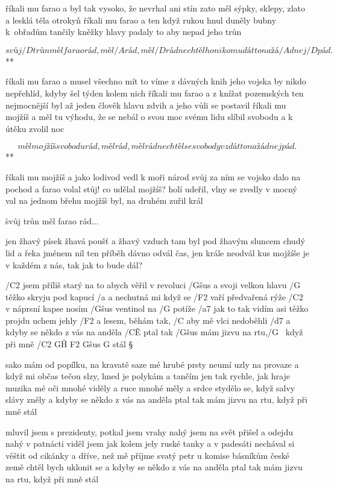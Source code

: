 říkali mu farao a byl tak vysoko, že nevrhal ani stín
zato měl sýpky, sklepy, zlato a lesklá těla otrokyň \s
říkali mu farao a ten když rukou hnul duněly bubny k~obřadům
tančily kněžky hlavy padaly to aby nepad jeho trůn \s

\R \[ svůj /D trůn měl farao rád, měl /A rád, měl /D rád
   nechtěl ho nikomu dát to na žá/A dnej /D pád. \]**

říkali mu farao a musel všechno mít to víme z dávných knih
jeho vojska by nikdo nepřehlíd, kdyby šel týden kolem nich \s
říkali mu farao a z knížat pozemských ten nejmocnější byl
až jeden člověk hlavu zdvih a jeho vůli se postavil \s
říkali mu mojžíš a měl tu výhodu, že se nebál o svou moc
svému lidu slíbil svobodu a k útěku zvolil noc \s

\R \[ měl mojžíš svobodu rád, měl rád, měl rád
   nechtěl se svobody vzdát to na žádnej pád.\]**

říkali mu mojžíš a jako lodivod vedl k moři národ svůj
za ním se vojsko dalo na pochod a farao volal stůj! \s
co udělal mojžíš? holí udeřil, vlny se zvedly v mocný val
na jednom břehu mojžíš byl, na druhém zuřil král \s

\r svůj trůn měl farao rád...

jen žhavý písek žhavá poušť a žhavý vzduch tam byl
pod žhavým sluncem chudý lid a řeka jménem nil \s
ten příběh dávno odvál čas, jen krále neodvál
kus mojžíše je v každém z nás, tak jak to bude dál?




/C2 jsem příliš starý na to abych věřil v revoluci
/G\^{sus} a svoji velkou hlavu /G těžko skryju pod kapucí
/a a nechutná mi když se /F2 vaří předvařená rýže
/C2 v náprsní kapse nosím /G\^{sus} ventinol na /G potíže
/a7 jak to tak vidím asi těžko projdu uchem jehly
/F2 a lesem, běhám tak, /C aby mě vlci nedoběhli
/d7 a kdyby se někdo z vás na anděla /C\^E ptal
tak /G\^{sus} mám jizvu na rtu,/G ~když při mně /{C2 G\^H F2 G\^{sus} G} stál \S

sako mám od popílku, na kravatě saze
mé hrubé prsty neumí uzly na provaze
a když mi občas tečou slzy, hned je polykám
a tančím jen tak rychle, jak hraje muzika
mé oči mnohé viděly a ruce mnohé měly
a srdce stydělo se, když salvy slávy zněly
a kdyby se někdo z vás na anděla ptal
tak mám jizvu na rtu, když při mně stál \s

mluvil jsem s prezidenty, potkal jsem vrahy
nahý jsem na svět přišel a odejdu nahý
v patnácti viděl jsem jak kolem jely ruské tanky
a v padesáti nechával si věštit od cikánky
a dříve, než mě příjme svatý petr u komise
básníkům české země chtěl bych uklonit se
a kdyby se někdo z vás na anděla ptal
tak mám jizvu na rtu, když při mně stál \s

